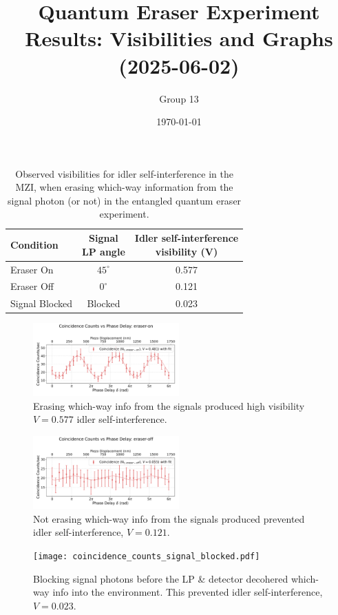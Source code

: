 \documentclass{article}
\title{Quantum Eraser Experiment Results: Visibilities and Graphs (2025-06-02)}
\author{Group 13} %
\date{\today}
\begin{document}
\pagestyle{empty} %

%

\begin{table}[h!]
\centering
\begin{tabular}{lcc}
\toprule
Condition & \makecell{Signal \\ LP angle} & \makecell{Idler self-interference \\ visibility (V)} \\
\midrule
Eraser On          & $45^\circ$  & 0.577 \\
Eraser Off         & $0^\circ$ & 0.121 \\
Signal Blocked     & Blocked & 0.023 \\
\bottomrule
\end{tabular}
\caption{
  Observed visibilities for idler self-interference in the MZI,
  when erasing which-way information from the signal photon (or not)
  in the entangled quantum eraser experiment.}
\end{table}

\begin{figure}[h!]
\centering
\includegraphics[width=0.5\textwidth]{coincidence_counts_eraser_on.pdf}
\caption*{
  Erasing which-way info from the signals
  produced high visibility $V=0.577$ idler self-interference.
}
\end{figure}

\begin{figure}[h!]
\centering
\includegraphics[width=0.5\textwidth]{coincidence_counts_eraser_off.pdf}
\caption*{
  Not erasing which-way info from the signals
  produced prevented idler self-interference, $V=0.121$.
}
\end{figure}

\begin{figure}[h!]
\centering
\texttt{[image: coincidence\_counts\_signal\_blocked.pdf]}
\caption*{
  Blocking signal photons before the LP \& detector decohered which-way
  info into the environment. This
  prevented idler self-interference, $V=0.023$.
}
\end{figure}
\end{document}
